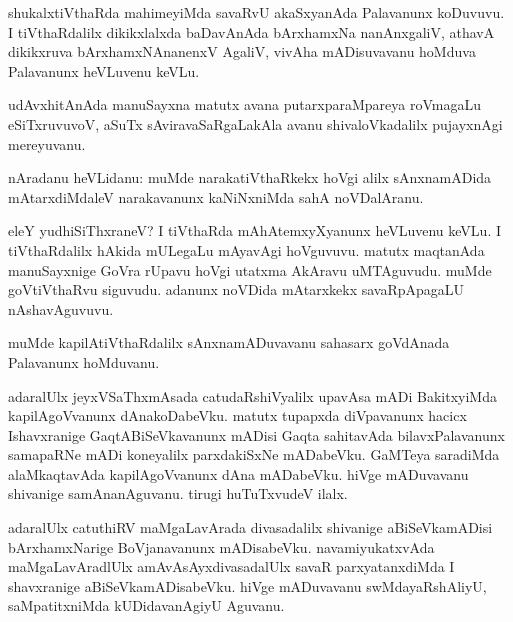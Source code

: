 \documentclass{article}
\begin{document}
\begin{mn}
shukalxtiVthaRda mahimeyiMda savaRvU akaSxyanAda Palavanunx koDuvuvu. I tiVthaRdalilx 
dikikxlalxda baDavAnAda bArxhamxNa nanAnxgaliV, athavA dikikxruva bArxhamxNAnanenxV AgaliV, vivAha
mADisuvavanu hoMduva Palavanunx heVLuvenu keVLu.
\end{mn}

\begin{mn}
udAvxhitAnAda manuSayxna matutx avana putarxparaMpareya roVmagaLu eSiTxruvuvoV, aSuTx 
sAviravaSaRgaLakAla avanu shivaloVkadalilx pujayxnAgi mereyuvanu.
\end{mn}



\begin{mn}
nAradanu heVLidanu: muMde narakatiVthaRkekx hoVgi alilx sAnxnamADida mAtarxdiMdaleV narakavanunx 
kaNiNxniMda sahA noVDalAranu.
\end{mn}

\begin{mn}
eleY yudhiSiThxraneV? I tiVthaRda mAhAtemxyXyanunx heVLuvenu keVLu. I tiVthaRdalilx hAkida 
mULegaLu mAyavAgi hoVguvuvu. matutx maqtanAda manuSayxnige GoVra rUpavu hoVgi utatxma AkAravu 
uMTAguvudu. muMde goVtiVthaRvu siguvudu. adanunx noVDida mAtarxkekx savaRpApagaLU nAshavAguvuvu.
\end{mn}

\begin{mn}
muMde kapilAtiVthaRdalilx sAnxnamADuvavanu sahasarx goVdAnada Palavanunx hoMduvanu.
\end{mn}

\begin{mn}
adaralUlx jeyxVSaThxmAsada catudaRshiVyalilx  upavAsa mADi BakitxyiMda kapilAgoVvanunx 
dAnakoDabeVku. matutx tupapxda diVpavanunx hacicx Ishavxranige GaqtABiSeVkavanunx mADisi Gaqta 
sahitavAda  bilavxPalavanunx samapaRNe mADi koneyalilx  parxdakiSxNe mADabeVku. GaMTeya saradiMda 
alaMkaqtavAda kapilAgoVvanunx dAna mADabeVku. hiVge mADuvavanu shivanige samAnanAguvanu. tirugi 
huTuTxvudeV ilalx.
\end{mn}

\begin{mn}
adaralUlx catuthiRV maMgaLavArada divasadalilx shivanige aBiSeVkamADisi bArxhamxNarige 
BoVjanavanunx mADisabeVku. navamiyukatxvAda maMgaLavAradlUlx amAvAsAyxdivasadalUlx savaR 
parxyatanxdiMda I shavxranige aBiSeVkamADisabeVku. hiVge mADuvavanu swMdayaRshAliyU, 
saMpatitxniMda kUDidavanAgiyU Aguvanu. 
\end{mn}
\end{document}
